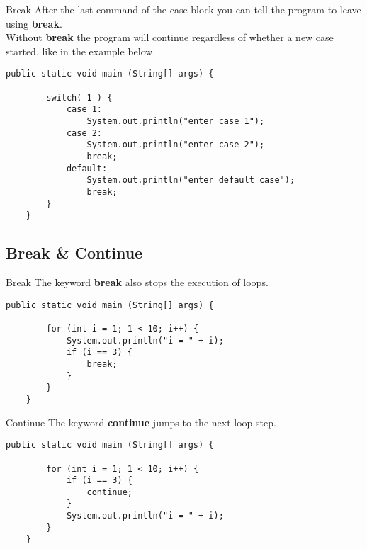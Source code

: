 \begin{frame}[fragile]{Break}
    After the last command of the case block    you can tell the program to leave using \textbf{break}.\\
    Without \textbf{break} the program will continue regardless of
    whether a new case started, like in the example below.
    \begin{lstlisting}[basicstyle=\ttfamily\scriptsize]
    public static void main (String[] args) {
    
        switch( 1 ) {
            case 1:
                System.out.println("enter case 1");
            case 2:
                System.out.println("enter case 2");
                break;
            default:
                System.out.println("enter default case");
                break;
        }
    }\end{lstlisting}
\end{frame}

\subsection{Break \& Continue}
\begin{frame}[fragile]{Break}
    The keyword \textbf{break} also stops the execution of loops.
    \begin{lstlisting}[basicstyle=\ttfamily\scriptsize]
    public static void main (String[] args) {
    
        for (int i = 1; 1 < 10; i++) {
            System.out.println("i = " + i);
            if (i == 3) {
                break;
            }
        }
    }\end{lstlisting}
\end{frame}

\begin{frame}[fragile]{Continue}
    The keyword \textbf{continue} jumps to the next loop step.
    \begin{lstlisting}[basicstyle=\ttfamily\scriptsize]
    public static void main (String[] args) {
    
        for (int i = 1; 1 < 10; i++) {
            if (i == 3) {
                continue;
            }
            System.out.println("i = " + i);
        }
    }\end{lstlisting}
\end{frame}

